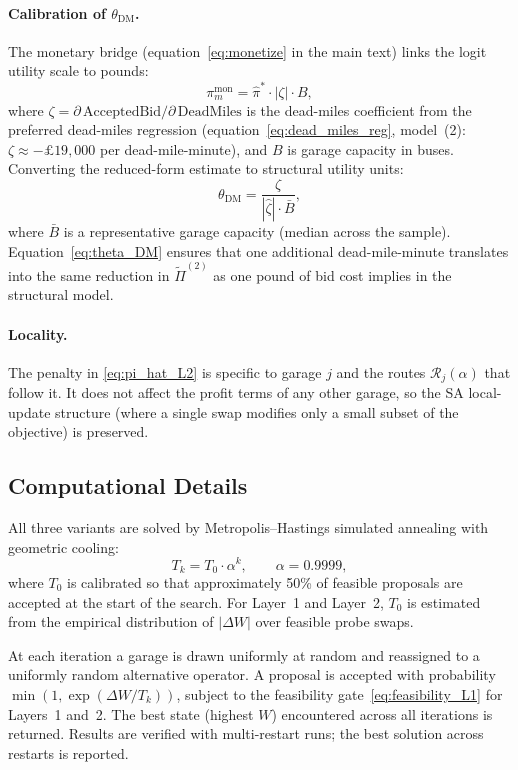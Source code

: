 \documentclass[12pt]{article}
\begin{document}
\paragraph{Calibration of $\theta_{\text{DM}}$.}
The monetary bridge (equation~\ref{eq:monetize} in the main text) links
the logit utility scale to pounds:
\[
  \pi^{\text{mon}}_m = \hat{\pi}^* \cdot |\zeta| \cdot B,
\]
where $\zeta = \partial\,\text{AcceptedBid}/\partial\,\text{DeadMiles}$
is the dead-miles coefficient from the preferred dead-miles regression
(equation~\ref{eq:dead_miles_reg}, model~(2): $\zeta \approx -\pounds19{,}000$
per dead-mile-minute), and $B$ is garage capacity in buses.  Converting
the reduced-form estimate to structural utility units:
\begin{equation} 
  \theta_{\text{DM}} = \frac{\zeta}{|\hat{\zeta}| \cdot \bar{B}},
  \label{eq:theta_DM}
\end{equation}
where $\bar{B}$ is a representative garage capacity (median across the
sample).  Equation~\eqref{eq:theta_DM} ensures that one additional
dead-mile-minute translates into the same reduction in $\tilde{\Pi}^{(2)}$
as one pound of bid cost implies in the structural model.

\paragraph{Locality.}
The penalty in \eqref{eq:pi_hat_L2} is specific to garage $j$ and the
routes $\mathcal{R}_j(\alpha)$ that follow it.  It does not affect the
profit terms of any other garage, so the SA local-update structure (where
a single swap modifies only a small subset of the objective) is
preserved.

\subsection{Computational Details}

All three variants are solved by Metropolis--Hastings simulated annealing
with geometric cooling:
\[
  T_k = T_0 \cdot \alpha^k, \qquad \alpha = 0.9999,
\]
where $T_0$ is calibrated so that approximately 50\% of feasible proposals
are accepted at the start of the search.  For Layer~1 and Layer~2,
$T_0$ is estimated from the empirical distribution of $|\Delta W|$ over
feasible probe swaps.

At each iteration a garage is drawn uniformly at random and reassigned to
a uniformly random alternative operator.  A proposal is accepted with
probability $\min(1, \exp(\Delta W / T_k))$, subject to the feasibility
gate~\eqref{eq:feasibility_L1} for Layers~1 and~2.  The best state
(highest $W$) encountered across all iterations is returned.  Results are
verified with multi-restart runs; the best solution across restarts is
reported.
\end{document}
